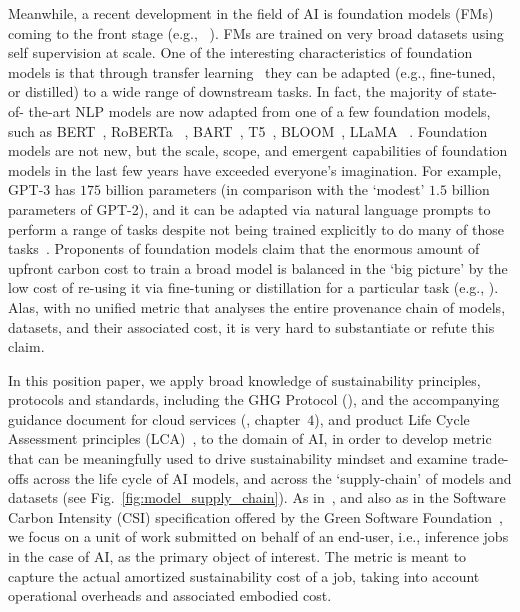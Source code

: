 {    Meanwhile, a recent development in the field of AI is foundation models (FMs) coming to the front stage (e.g., ~\cite{Rishi2022}). FMs are trained on very broad datasets using self supervision at scale. One of the interesting characteristics of foundation models is that through transfer learning~\cite{Thrun1998} they can be adapted (e.g., fine-tuned, or distilled) to a wide range of downstream tasks. In fact, the majority of state-of- the-art NLP models are now adapted from one of a few foundation models, such as BERT~\cite{Devlin2018}, RoBERTa ~\cite{Liu2019}, BART~\cite{Lewis2019}, T5~\cite{Raffel2020}, BLOOM~\cite{Workshop2023Bloom}, LLaMA ~\cite{Touvron2023}. Foundation models are not new, but the scale, scope, and emergent capabilities of foundation models in the last few years have exceeded everyone's imagination. For example, GPT-3 has $175$ billion parameters (in comparison with the `modest' $1.5$ billion parameters of GPT-2), and it can be adapted via natural language prompts to perform a range of tasks despite not being trained explicitly to do many of those tasks~\cite{Brown2020}. Proponents of foundation models claim that the enormous amount of upfront carbon cost to train a broad model is balanced in the `big picture' by the low cost of re-using it via fine-tuning or distillation for a particular task (e.g., \cite{Rishi2022}). Alas, with no unified metric that analyses the entire provenance chain of models, datasets, and their associated cost, it is very hard to substantiate or refute this claim. 

    In this position paper, we apply broad knowledge of sustainability principles, protocols and standards, including the GHG Protocol (\cite{GHG-Protocol}), and the accompanying guidance document for cloud services (\cite{GHG-Guidance}, chapter~$4$), and product Life Cycle Assessment principles (LCA)~\cite{LCA}, to the domain of AI, in order to develop metric that can be meaningfully used to drive sustainability mindset and examine trade-offs across the life cycle of AI models, and across the `supply-chain' of models and datasets (see Fig.~\ref{fig:model_supply_chain}). As in~\cite{Gandhi2022}, and also as in the Software Carbon Intensity (CSI) specification offered by the Green Software Foundation~\cite{GSF}, we focus on a unit of work submitted on behalf of an end-user, i.e., inference jobs in the case of AI, as the primary object of interest. The metric is meant to capture the actual amortized sustainability cost of a job, taking into account operational overheads and associated embodied cost. 

}

